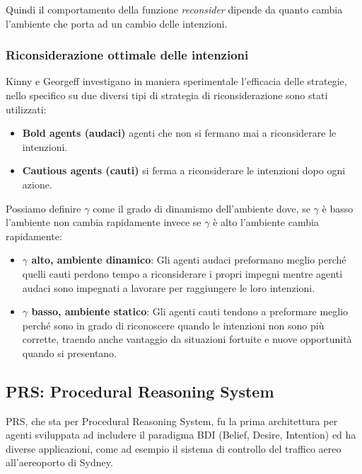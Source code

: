 Quindi il comportamento della funzione \textit{reconsider} dipende da quanto cambia l'ambiente che porta ad un cambio delle intenzioni.

\subsubsection{Riconsiderazione ottimale delle intenzioni}
Kinny e Georgeff investigano in maniera sperimentale l’efficacia delle strategie, nello specifico su due diversi tipi di strategia di riconsiderazione sono stati utilizzati:
\begin{itemize}
    \item \textbf{Bold agents (audaci)} agenti che non si fermano mai a riconsiderare le intenzioni.
    \item \textbf{Cautious agents (cauti)} si ferma a riconsiderare le intenzioni dopo ogni azione.
\end{itemize}

Possiamo definire $\gamma$ come il grado di dinamismo dell’ambiente dove, se $\gamma$ è basso l’ambiente non cambia rapidamente invece se $\gamma$ è alto l'ambiente cambia rapidamente:
\begin{itemize}
    \item \textbf{$\gamma$ alto, ambiente dinamico}: Gli agenti audaci preformano meglio perché quelli cauti perdono tempo a riconsiderare i propri impegni mentre agenti audaci sono impegnati a lavorare per raggiungere le loro intenzioni.
    \item \textbf{$\gamma$ basso, ambiente statico}: Gli agenti cauti tendono a preformare meglio perché sono in grado di riconoscere quando le intenzioni non sono più corrette, traendo anche vantaggio da situazioni fortuite e nuove opportunità quando si presentano.
\end{itemize}

\newpage

\subsection{PRS: Procedural Reasoning System}
PRS, che sta per Procedural Reasoning System, fu la prima architettura per agenti sviluppata ad includere il paradigma BDI (Belief, Desire, Intention) ed ha diverse applicazioni, come ad esempio il sistema di controllo del traffico aereo all'aereoporto di Sydney.


